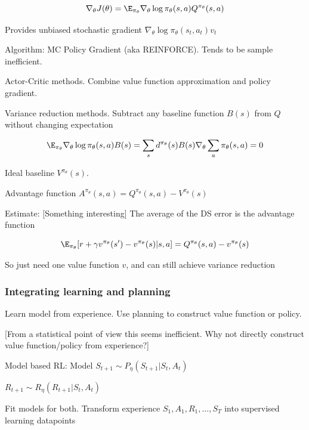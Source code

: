 \documentclass[english]{article}
\begin{document}
$$\nabla_\theta J(\theta) 
=
\E_{\pi_\theta} \nabla_\theta \log \pi_\theta(s,a)
Q^{\pi_\theta}(s,a)
$$ 

Provides unbiased stochastic gradient $\nabla_\theta \log \pi_\theta(s_t,a_t)v_t$

Algorithm: MC Policy Gradient (aka REINFORCE). Tends to be sample inefficient.

\item Actor-Critic methods. Combine value function approximation and policy gradient. 

\item Variance reduction methods. Subtract any baseline function $B(s)$ from $Q$ without changing expectation

$$
\E_{\pi_\theta} \nabla_\theta \log \pi_\theta(s,a)
B(s)
=
\sum_s d^{\pi_\theta}(s) B(s)\nabla_\theta  \sum_a \pi_\theta(s,a) =0
$$ 

Ideal baseline $V^{\pi_\theta}(s)$. 

Advantage function $A^{\pi_\theta}(s,a)=Q^{\pi_\theta}(s,a)-V^{\pi_\theta}(s)$

Estimate: [Something interesting] The average of the DS error is the advantage function

$$
\E_{\pi_\theta}
[r+\gamma v^{\pi_\theta}(s')-v^{\pi_\theta}(s)|s,a]
=
Q^{\pi_\theta}(s,a)- v^{\pi_\theta}(s)
$$ 

So just need one value function $v$, and can still achieve variance reduction




\eenum 




\subsubsection{Integrating learning and planning}
\benum

\item Learn model from experience. Use planning to construct value function or policy.

[From a statistical point of view this seems inefficient. Why not directly construct value function/policy from experience?]


\item Model based RL: Model $S_{t+1}\sim P_\eta(S_{t+1}|S_t, A_t)$

$R_{t+1}\sim R_\eta(R_{t+1}|S_t, A_t)$

Fit models for both. Transform experience $S_1,A_1, R_1, \ldots, S_T$ into supervised learning datapoints
\end{document}
